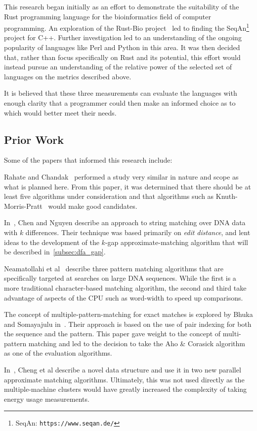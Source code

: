 This research began initially as an effort to demonstrate the suitability of the Rust programming language for the bioinformatics field of computer programming. An exploration of the Rust-Bio project~\cite{rust} led to finding the SeqAn\footnote{SeqAn: \texttt{https://www.seqan.de/}} project for C++. Further investigation led to an understanding of the ongoing popularity of languages like Perl and Python in this area. It was then decided that, rather than focus specifically on Rust and its potential, this effort would instead pursue an understanding of the relative power of the selected set of languages on the metrics described above.

It is believed that these three measurements can evaluate the languages with enough clarity that a programmer could then make an informed choice as to which would better meet their needs.

\subsection{Prior Work}

Some of the papers that informed this research include:

Rahate and Chandak~\cite{rahate} performed a study very similar in nature and scope as what is planned here. From this paper, it was determined that there should be at least five algorithms under consideration and that algorithms such as Knuth-Morris-Pratt~\cite{knuth} would make good candidates.

In~\cite{chen2021string}, Chen and Nguyen describe an approach to string matching over DNA data with $k$ differences. Their technique was based primarily on \textit{edit distance}, and lent ideas to the development of the $k$-gap approximate-matching algorithm that will be described in~\ref{subsec:dfa_gap}.

Neamatollahi et al~\cite{neamatollahi} describe three pattern matching algorithms that are specifically targeted at searches on large DNA sequences. While the first is a more traditional character-based matching algorithm, the second and third take advantage of aspects of the CPU such as word-width to speed up comparisons.

The concept of multiple-pattern-matching for exact matches is explored by Bhuka and Somayajulu in~\cite{bhukya}. Their approach is based on the use of pair indexing for both the sequence and the pattern. This paper gave weight to the concept of multi-pattern matching and led to the decision to take the Aho \& Corasick algorithm~\cite{aho} as one of the evaluation algorithms.

In~\cite{cheng2003approximate}, Cheng et al describe a novel data structure and use it in two new parallel approximate matching algorithms. Ultimately, this was not used directly as the multiple-machine clusters would have greatly increased the complexity of taking energy usage measurements.
